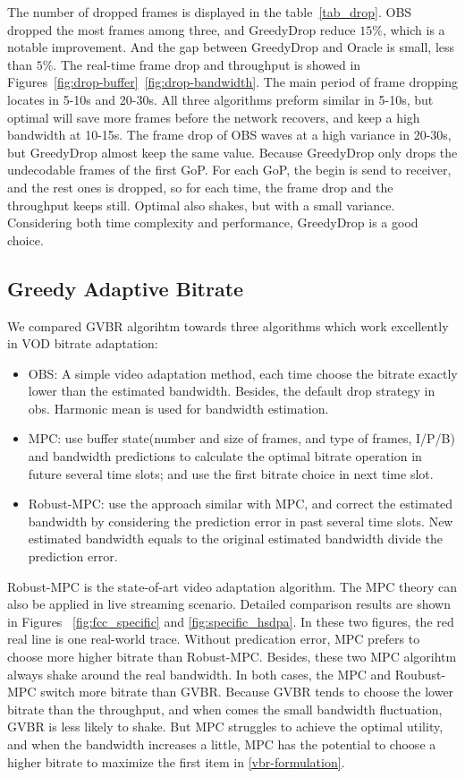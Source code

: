 

The number of dropped frames is displayed in the table~\ref{tab_drop}. OBS dropped the most frames among three, and GreedyDrop reduce $15\%$, which is a notable improvement. And the gap between GreedyDrop and Oracle is small, less than $5\%$. The real-time frame drop and throughput is showed in Figures~\ref{fig:drop-buffer}~\ref{fig:drop-bandwidth}. The main period of frame dropping locates in 5-10s and 20-30s. All three algorithms preform similar in 5-10s, but optimal will save more frames before the network recovers, and keep a high bandwidth at 10-15s. The frame drop of OBS waves at a high variance in 20-30s, but GreedyDrop almost keep the same value. Because GreedyDrop only drops the undecodable frames of the first GoP. For each GoP, the begin is send to receiver, and the rest ones is dropped, so for each time, the frame drop and the throughput keeps still. Optimal also shakes, but with a small variance. Considering both time complexity and performance, GreedyDrop is a good choice.


\subsection{Greedy Adaptive Bitrate}

We compared GVBR algorihtm towards three algorithms which work excellently in VOD bitrate adaptation:
\begin{itemize}
  \item OBS: A simple video adaptation method, each time choose the bitrate exactly lower than the estimated bandwidth. Besides, the default drop strategy in obs. Harmonic mean is used for bandwidth estimation.
  \item MPC: use buffer state(number and size of frames, and type of frames, I/P/B) and bandwidth predictions to calculate the optimal bitrate operation in future several time slots; and use the first bitrate choice in next time slot.
  \item Robust-MPC: use the approach similar with MPC, and correct the estimated bandwidth by considering the prediction error in past several time slots. New estimated bandwidth equals to the original estimated bandwidth divide the prediction error.
\end{itemize}
Robust-MPC is the state-of-art video adaptation algorithm. The MPC theory can also be applied in live streaming scenario.
Detailed comparison results are shown in Figures ~\ref{fig:fcc_specific} and \ref{fig:specific_hsdpa}. In these two figures, the red real line is one real-world trace. Without predication error, MPC prefers to choose more higher bitrate than Robust-MPC. Besides, these two MPC algorihtm always shake around the real bandwidth. In both cases, the MPC and Roubust-MPC switch more bitrate than GVBR. Because GVBR tends to choose the lower bitrate than the throughput, and when comes the small bandwidth fluctuation, GVBR is less likely to shake. But MPC struggles to achieve the optimal utility, and when the bandwidth increases a little, MPC has the potential to choose a higher bitrate to maximize the first item in \ref{vbr-formulation}.

